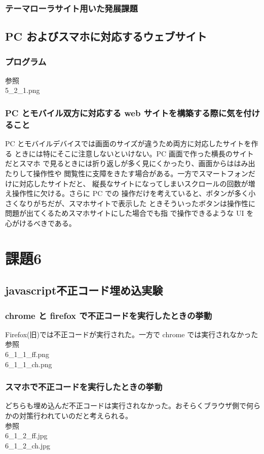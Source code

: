 \documentclass[a4j]{jarticle}
\begin{document}
      \subsubsection{テーマローラサイト用いた発展課題}
    \subsection{PC およびスマホに対応するウェブサイト}
      \subsubsection{プログラム}
        参照\\
        5\_2\_1.png
      \subsubsection{PC とモバイル双方に対応する web サイトを構築する際に気を付けること}
            PC とモバイルデバイスでは画面のサイズが違うため両方に対応したサイトを作る
        ときには特にそこに注意しないといけない。PC 画面で作った横長のサイトだとスマホ
        で見るときには折り返しが多く見にくかったり、画面からははみ出たりして操作性や
        閲覧性に支障をきたす場合がある。一方でスマートフォンだけに対応したサイトだと、
        縦長なサイトになってしまいスクロールの回数が増え操作性に欠ける。さらに PC での
        操作だけを考えていると、ボタンが多く小さくなりがちだが、スマホサイトで表示した
        ときそういったボタンは操作性に問題が出てくるためスマホサイトにした場合でも指
        で操作できるような UI を心がけるべきである。
  \section{課題6}
    \subsection{javascript不正コード埋め込実験}
      \subsubsection{chrome と firefox で不正コードを実行したときの挙動}
        Firefox(旧)では不正コードが実行された。一方で chrome では実行されなかった\\
        参照\\
        6\_1\_1\_ff.png\\
        6\_1\_1\_ch.png
      \subsubsection{スマホで不正コードを実行したときの挙動}
        どちらも埋め込んだ不正コードは実行されなかった。おそらくブラウザ側で何らかの対策行われていのだと考えられる。\\
        参照\\
        6\_1\_2\_ff.jpg\\
        6\_1\_2\_ch.jpg
\end{document}
